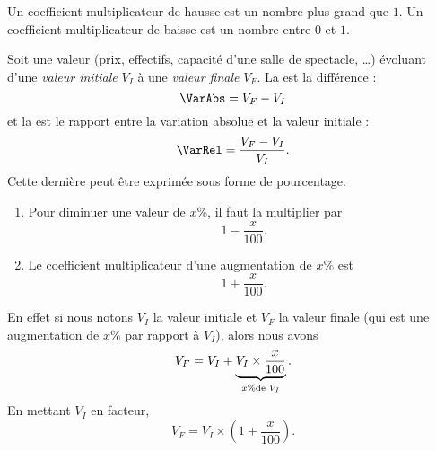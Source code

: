 Un coefficient multiplicateur de hausse est un nombre plus grand que \( 1\). Un coefficient multiplicateur de baisse est un nombre entre \( 0\) et \( 1\).

\begin{definition}
    Soit une valeur (prix, effectifs, capacité d'une salle de spectacle, \ldots) évoluant d'une \emph{valeur initiale} \( V_I\) à une \emph{valeur finale} \( V_F\). La  est la différence :
    \begin{equation}
        \VarAbs=V_F-V_I
    \end{equation}
    et la  est le rapport entre la variation absolue et la valeur initiale :
    \begin{equation}
        \VarRel=\frac{ V_F-V_I }{ V_I }.
    \end{equation}
    Cette dernière peut être exprimée sous forme de pourcentage.
\end{definition}

\begin{Aretenir}
    \begin{enumerate}
        \item
            Pour diminuer une valeur de \( x\%\), il faut la multiplier par 
            \begin{equation}
                1-\frac{ x }{ 100 }.
            \end{equation}
        \item
            Le coefficient multiplicateur d'une augmentation de \( x\%\) est
            \begin{equation}
                1+\frac{ x }{ 100 }.
            \end{equation}
    \end{enumerate}
\end{Aretenir}

En effet si nous notons \( V_I\) la valeur initiale et \( V_F\) la valeur finale (qui est une augmentation de \( x\%\) par rapport à \( V_I\)), alors nous avons
\begin{equation}
    V_F=V_I+\underbrace{V_I\times \frac{ x }{ 100 }}_{x\% \text{de \( V_I\)}}.
\end{equation}
En mettant \( V_I\) en facteur,
\begin{equation}
    V_F=V_I\times \left( 1+\frac{ x }{ 100 } \right).
\end{equation}

